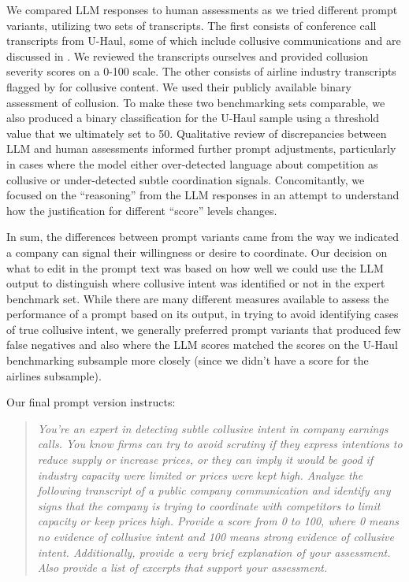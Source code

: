 We compared LLM responses to human assessments as we tried different prompt variants, utilizing two sets of transcripts. The first consists of conference call transcripts from U-Haul, some of which include collusive communications and are discussed in \textcite{harrington2022collusion}. We reviewed the transcripts ourselves and provided collusion severity scores on a 0-100 scale. The other consists of airline industry transcripts flagged by \textcite{aryal2022coordinated} for collusive content. We used their publicly available binary assessment of collusion. To make these two benchmarking sets comparable, we also produced a binary classification for the U-Haul sample using a threshold value that we ultimately set to 50. Qualitative review of discrepancies between LLM and human assessments informed further prompt adjustments, particularly in cases where the model either over-detected language about competition as collusive or under-detected subtle coordination signals. Concomitantly, we focused on the ``reasoning'' from the LLM responses in an attempt to understand how the justification for different ``score'' levels changes. 

In sum, the differences between prompt variants came from the way we indicated a company can signal their willingness or desire to coordinate. Our decision on what to edit in the prompt text was based on how well we could use the LLM output to distinguish where collusive intent was identified or not in the expert benchmark set. While there are many different measures available to assess the performance of a prompt based on its output, in trying to avoid identifying cases of true collusive intent, we generally preferred prompt variants that produced few false negatives and also where the LLM scores matched the scores on the U-Haul benchmarking subsample more closely (since we didn't have a score for the airlines subsample). 

Our final prompt version instructs:
\begin{quote}
\textit{You’re an expert in detecting subtle collusive intent in company earnings calls. You know firms can try to avoid scrutiny if they express intentions to reduce supply or increase prices, or they can imply it would be good if industry capacity were limited or prices were kept high. Analyze the following transcript of a public company communication and identify any signs that the company is trying to coordinate with competitors to limit capacity or keep prices high. Provide a score from 0 to 100, where 0 means no evidence of collusive intent and 100 means strong evidence of collusive intent. Additionally, provide a very brief explanation of your assessment. Also provide a list of excerpts that support your assessment.}
\end{quote}

